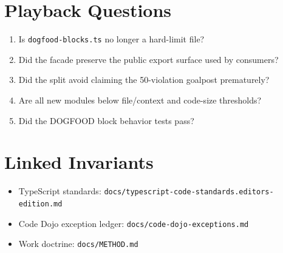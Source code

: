 \section{Playback Questions}\label{record-253-playback-questions}

\begin{enumerate}
\def\labelenumi{\arabic{enumi}.}
\tightlist
\item
  Is \texttt{d\allowbreak{}o\allowbreak{}g\allowbreak{}f\allowbreak{}o\allowbreak{}o\allowbreak{}d\allowbreak{}-\allowbreak{}b\allowbreak{}l\allowbreak{}o\allowbreak{}c\allowbreak{}k\allowbreak{}s\allowbreak{}.\allowbreak{}t\allowbreak{}s} no longer a hard-limit file?
\item
  Did the facade preserve the public export surface used by consumers?
\item
  Did the split avoid claiming the 50-violation goalpost prematurely?
\item
  Are all new modules below file/context and code-size thresholds?
\item
  Did the DOGFOOD block behavior tests pass?
\end{enumerate}

\section{Linked Invariants}\label{record-253-linked-invariants}

\begin{itemize}
\tightlist
\item
  TypeScript standards: \texttt{d\allowbreak{}o\allowbreak{}c\allowbreak{}s\allowbreak{}/\allowbreak{}t\allowbreak{}y\allowbreak{}p\allowbreak{}e\allowbreak{}s\allowbreak{}c\allowbreak{}r\allowbreak{}i\allowbreak{}p\allowbreak{}t\allowbreak{}-\allowbreak{}c\allowbreak{}o\allowbreak{}d\allowbreak{}e\allowbreak{}-\allowbreak{}s\allowbreak{}t\allowbreak{}a\allowbreak{}n\allowbreak{}d\allowbreak{}a\allowbreak{}r\allowbreak{}d\allowbreak{}s\allowbreak{}.\allowbreak{}e\allowbreak{}d\allowbreak{}i\allowbreak{}t\allowbreak{}o\allowbreak{}r\allowbreak{}s\allowbreak{}-\allowbreak{}e\allowbreak{}d\allowbreak{}i\allowbreak{}t\allowbreak{}i\allowbreak{}o\allowbreak{}n\allowbreak{}.\allowbreak{}m\allowbreak{}d}
\item
  Code Dojo exception ledger: \texttt{d\allowbreak{}o\allowbreak{}c\allowbreak{}s\allowbreak{}/\allowbreak{}c\allowbreak{}o\allowbreak{}d\allowbreak{}e\allowbreak{}-\allowbreak{}d\allowbreak{}o\allowbreak{}j\allowbreak{}o\allowbreak{}-\allowbreak{}e\allowbreak{}x\allowbreak{}c\allowbreak{}e\allowbreak{}p\allowbreak{}t\allowbreak{}i\allowbreak{}o\allowbreak{}n\allowbreak{}s\allowbreak{}.\allowbreak{}m\allowbreak{}d}
\item
  Work doctrine: \texttt{d\allowbreak{}o\allowbreak{}c\allowbreak{}s\allowbreak{}/\allowbreak{}M\allowbreak{}E\allowbreak{}T\allowbreak{}H\allowbreak{}O\allowbreak{}D\allowbreak{}.\allowbreak{}m\allowbreak{}d}
\end{itemize}

